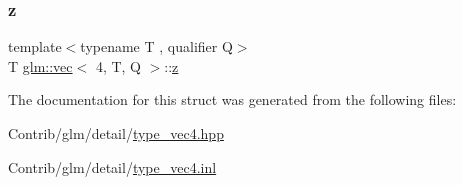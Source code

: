 \subsubsection{\texorpdfstring{z}{z}}
{\footnotesize\ttfamily template$<$typename T , qualifier Q$>$ \\
T \mbox{\hyperlink{structglm_1_1vec}{glm\+::vec}}$<$ 4, T, Q $>$\+::\mbox{\hyperlink{_s_d_l__opengl__glext_8h_a5e74030ebb3297ce1b37ff716fedd68f}{z}}}



The documentation for this struct was generated from the following files\+:\begin{DoxyCompactItemize}
\item 
Contrib/glm/detail/\mbox{\hyperlink{type__vec4_8hpp}{type\+\_\+vec4.\+hpp}}\item 
Contrib/glm/detail/\mbox{\hyperlink{type__vec4_8inl}{type\+\_\+vec4.\+inl}}\end{DoxyCompactItemize}
